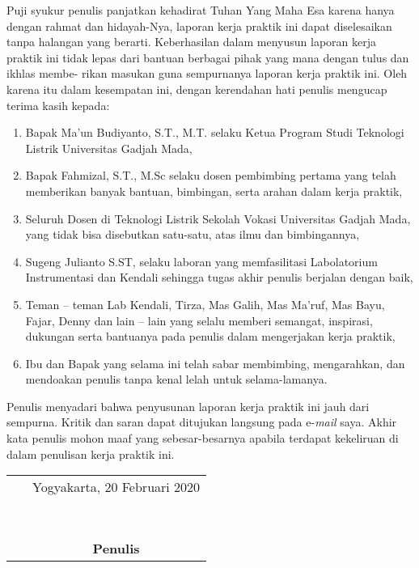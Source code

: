 \documentclass{DTEDI_KP}
\begin{document}
	
	\cover
	
	\approvalpage
	
	\preface
	
Puji syukur penulis panjatkan kehadirat Tuhan Yang Maha Esa karena hanya dengan rahmat dan hidayah-Nya, laporan kerja praktik ini dapat diselesaikan tanpa halangan yang berarti. Keberhasilan dalam menyusun laporan kerja praktik ini tidak lepas dari bantuan berbagai pihak yang mana dengan tulus dan ikhlas membe- rikan masukan guna sempurnanya laporan kerja praktik ini.  Oleh karena itu dalam kesempatan ini, dengan kerendahan hati penulis mengucap terima kasih kepada:
	
	\begin{enumerate}
		\item Bapak Ma’un Budiyanto, S.T., M.T. selaku Ketua Program Studi Teknologi Listrik Universitas Gadjah Mada,
		\item  Bapak Fahmizal, S.T., M.Sc selaku dosen pembimbing pertama yang telah memberikan banyak bantuan, bimbingan, serta arahan dalam kerja praktik,
		\item Seluruh Dosen di Teknologi Listrik Sekolah Vokasi Universitas Gadjah Mada, yang tidak bisa disebutkan satu-satu, atas ilmu dan bimbingannya,
		\item Sugeng Julianto S.ST, selaku laboran yang memfasilitasi Labolatorium Instrumentasi dan Kendali sehingga tugas akhir penulis berjalan dengan baik, 
		\item Teman – teman Lab Kendali, Tirza, Mas Galih, Mas Ma'ruf, Mas Bayu, Fajar, Denny dan lain – lain yang selalu memberi semangat, inspirasi, dukungan serta bantuanya pada penulis dalam mengerjakan kerja praktik,
		\item Ibu dan Bapak yang selama ini telah sabar membimbing, mengarahkan, dan mendoakan penulis tanpa kenal lelah untuk selama-lamanya.
		
	\end{enumerate}

Penulis menyadari bahwa penyusunan laporan kerja praktik ini jauh dari sempurna. Kritik dan saran dapat ditujukan langsung pada e-\textit{mail} saya. Akhir kata penulis mohon maaf yang sebesar-besarnya apabila terdapat kekeliruan di dalam penulisan kerja praktik ini.

\vspace{0.1cm}

	\begin{tabular}{p{7.5cm}c}
	&Yogyakarta, 20 Februari 2020 \\\
	&\\
	&\\
	&\\
	&\\
	&\textbf{Penulis}
	\end{tabular}
\end{document}

